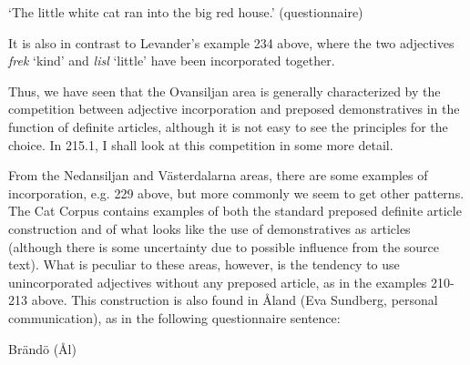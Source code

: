 \begin{styleTranslation}
‘The little white cat ran into the big red house.’ (questionnaire)

\end{styleTranslation}

\begin{styleBodyTextFirst}
It is also in contrast to Levander’s example 234 above, where the two adjectives \textit{frek} ‘kind’ and \textit{lisl} ‘little’ have been incorporated together. 

\end{styleBodyTextFirst}

\begin{styleBodytextC}
Thus, we have seen that the Ovansiljan area is generally characterized by the competition between adjective incorporation and preposed demonstratives in the function of definite articles, although it is not easy to see the principles for the choice. In 215.1, I shall look at this competition in some more detail.

\end{styleBodytextC}

\begin{styleBodytextC}
From the Nedansiljan and Västerdalarna areas, there are some examples of incorporation, e.g. 229 above, but more commonly we seem to get other patterns. The Cat Corpus contains examples of both the standard preposed definite article construction and of what looks like the use of demonstratives as articles (although there is some uncertainty due to possible influence from the source text). What is peculiar to these areas, however, is the tendency to use unincorporated adjectives without any preposed article, as in the examples 210{}-213 above. This construction is also found in Åland (Eva Sundberg, personal communication), as in the following questionnaire sentence:

\end{styleBodytextC}

\begin{listWWNumileveli}
\item {}

\begin{styleExample}
Brändö (Ål)

\end{styleExample}

\end{listWWNumileveli}

